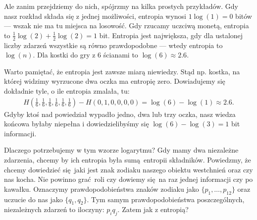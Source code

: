 \documentclass[10pt,a4paper]{article}
\begin{document}
Ale zanim przejdziemy do nich, spójrzmy na kilka prostych przykładów.
Gdy nasz rozkład składa się z jednej możliwości, entropia wynosi $1 \log(1) = 0$ bitów --- wszak nie ma tu miejsca na losowość.
Gdy rzucamy uczciwą monetą, entropia to $\tfrac{1}{2} \log(2) + \tfrac{1}{2} \log(2) = 1$ bit.
Entropia jest największa, gdy dla ustalonej liczby zdarzeń wszystkie są równo prawdopodobne --- wtedy entropia to $\log(n)$.
Dla kostki do gry z $6$ ścianami to $\log(6)\approx 2.6$.

Warto pamiętać, że entropia jest zawsze miarą niewiedzy.
Stąd np. kostka, na której widzimy wyrzucone dwa oczka ma entropię zero.
Dowiadujemy się dokładnie tyle, o ile entropia zmalała, tu:
%
\begin{align}
    H(\tfrac{1}{6}, \tfrac{1}{6}, \tfrac{1}{6}, \tfrac{1}{6}, \tfrac{1}{6}, \tfrac{1}{6})
    - H(0, 1, 0, 0, 0, 0) = \log(6) - \log(1)
    \approx 2.6.
\end{align}
%
Gdyby ktoś nad powiedział wypadło jedno, dwa lub trzy oczka, nasz wiedza końcowa byłaby niepełna i dowiedzielibyśmy się $\log(6) - \log(3) = 1 $ bit informacji.




Dlaczego potrzebujemy w tym wzorze logarytmu? 
Gdy mamy dwa niezależne zdarzenia, chcemy by ich entropia była sumą entropii składników.
Powiedzmy, że chcemy dowiedzieć się jaki jest znak zodiaku naszego obiektu westchnień oraz czy nas kocha.
Nie powinno grać roli czy dowiemy się na raz jednej informacji czy po kawałku.
Oznaczymy prawdopodobieństwa znaków zodiaku jako $\{p_1, \ldots, p_{12} \}$ oraz uczucie do nas jako $\{q_1, q_2\}$.
Tym samym prawdopodobieństwa poszczególnych, niezależnych zdarzeń to iloczyny: $p_i q_j$.
Zatem jak z entropią?
%
%
\end{document}
